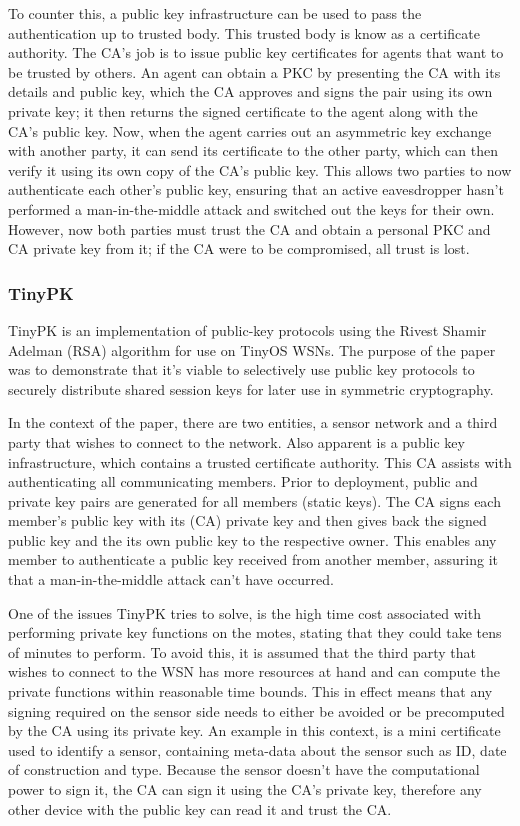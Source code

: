 \documentclass{mprop}
\begin{document}
To counter this, a public key infrastructure can be used to pass the authentication up to trusted body. This trusted body is know as a certificate authority. The CA's job is to issue public key certificates for agents that want to be trusted by others. An agent can obtain a PKC by presenting the CA with its details and public key, which the CA approves and signs the pair using its own private key; it then returns the signed certificate to the agent along with the CA's public key. Now, when the agent carries out an asymmetric key exchange with another party, it can send its certificate to the other party, which can then verify it using its own copy of the CA's public key. This allows two parties to now authenticate each other's public key, ensuring that an active eavesdropper hasn't performed a man-in-the-middle attack and switched out the keys for their own. However, now both parties must trust the CA and obtain a personal PKC and CA private key from it; if the CA were to be compromised, all trust is lost.


\subsubsection{TinyPK} %
\label{ssub:tinypk}
TinyPK is an implementation of public-key protocols using the Rivest Shamir Adelman (RSA) algorithm for use on TinyOS WSNs\cite{TinyPK}. The purpose of the paper was to demonstrate that it's viable to selectively use public key protocols to securely distribute shared session keys for later use in symmetric cryptography.

In the context of the paper, there are two entities, a sensor network and a third party that wishes to connect to the network. Also apparent is a public key infrastructure, which contains a trusted certificate authority. This CA assists with authenticating all communicating members. Prior to deployment, public and private key pairs are generated for all members (static keys). The CA signs each member's public key with its (CA) private key and then gives back the signed public key and the its own public key to the respective owner. This enables any member to authenticate a public key received from another member, assuring it that a man-in-the-middle attack can't have occurred.

One of the issues TinyPK tries to solve, is the high time cost associated with performing private key functions on the motes, stating that they could take tens of minutes to perform. To avoid this, it is assumed that the third party that wishes to connect to the WSN has more resources at hand and can compute the private functions within reasonable time bounds. This in effect means that any signing required on the sensor side needs to either be avoided or be precomputed by the CA using its private key. An example in this context, is a mini certificate used to identify a sensor, containing meta-data about the sensor such as ID, date of construction and type. Because the sensor doesn't have the computational power to sign it, the CA can sign it using the CA's private key, therefore any other device with the public key can read it and trust the CA.
\end{document}
